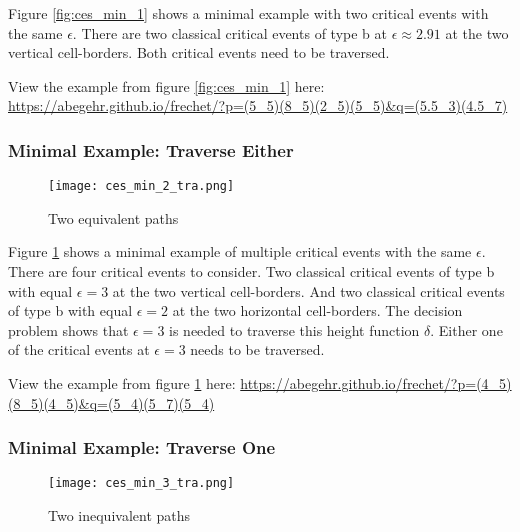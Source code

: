 Figure \ref{fig:ces_min_1} shows a minimal example with two critical events with the same $\epsilon$. There are two classical critical events of type b at $\epsilon \approx 2.91$ at the two vertical cell-borders. Both critical events need to be traversed.

View the example from figure \ref{fig:ces_min_1} here: \url{https://abegehr.github.io/frechet/?p=(5_5)(8_5)(2_5)(5_5)&q=(5.5_3)(4.5_7)}


\subsubsection{Minimal Example: Traverse Either}\label{sec:ces_min_2}

\begin{figure}[H]
    \centering
    
    \texttt{[image: ces\_min\_2\_tra.png]}
		
	\caption{Two equivalent paths}
    \label{fig:ces_min_2}
\end{figure}

Figure \ref{fig:ces_min_2} shows a minimal example of multiple critical events with the same $\epsilon$. There are four critical events to consider. Two classical critical events of type b with equal $\epsilon = 3$ at the two vertical cell-borders. And two classical critical events of type b with equal $\epsilon = 2$ at the two horizontal cell-borders. The decision problem shows that $\epsilon = 3$ is needed to traverse this height function $\delta$. Either one of the critical events at $\epsilon = 3$ needs to be traversed.

View the example from figure \ref{fig:ces_min_2} here: \url{https://abegehr.github.io/frechet/?p=(4_5)(8_5)(4_5)&q=(5_4)(5_7)(5_4)}



\subsubsection{Minimal Example: Traverse One}

\begin{figure}[H]
    \centering
    
    \texttt{[image: ces\_min\_3\_tra.png]}
		
	\caption{Two inequivalent paths}
    \label{fig:ces_min_3}
\end{figure}

